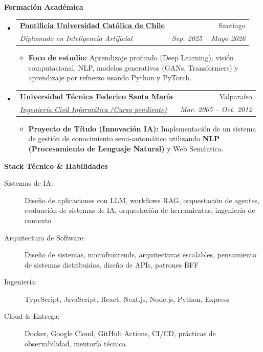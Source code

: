 \documentclass[letterpaper,11pt]{article}
\makeatletter
\newcommand{\resitem}[1]{\item #1 \vspace{-2pt}}
\newcommand{\resheading}[1]{{\large \colorbox{mygrey}{\begin{minipage}{\textwidth}{\textbf{#1 \vphantom{p\^{E}}}}\end{minipage}}}}
\newcommand{\ressubheading}[4]{
    \begin{tabular*}{6.5in}{l@{\extracolsep{\fill}}r}
            \textbf{#1} & #2 \\
            \textit{#3} & \textit{#4} \\
    \end{tabular*}\vspace{-6pt}}
\makeatother
\begin{document}
    \newpage
    \resheading{Formación Académica}
        \begin{itemize}
            \item
                \ressubheading{\href{https://educacionprofesional.ing.uc.cl/?diplomado=diplomado-en-inteligencia-artificial}{Pontificia Universidad Católica de Chile}}{Santiago}{Diplomado en Inteligencia Artificial}{Sep. 2025 -- Mayo 2026}
                    { \footnotesize
                    \begin{itemize}
                        \resitem{\textbf{Foco de estudio:} Aprendizaje profundo (Deep Learning), visión computacional, NLP, modelos generativos (GANs, Transformers) y aprendizaje por refuerzo usando Python y PyTorch.}
                    \end{itemize}
                    }
            \item
                \ressubheading{\href{http://www.usm.cl}{Universidad Técnica Federico Santa María}}{Valparaíso}{\href{http://www.inf.utfsm.cl}{Ingeniería Civil Informática (Curso pendiente)}}{Mar. 2005 -- Oct. 2012}
                    { \footnotesize
                    \begin{itemize}
                        \resitem{\textbf{Proyecto de Título (Innovación IA):} Implementación de un sistema de gestión de conocimiento semi-automático utilizando \textbf{NLP (Procesamiento de Lenguaje Natural)} y Web Semántica.}
                    \end{itemize}
                    }
        \end{itemize}

    \resheading{Stack Técnico \& Habilidades}
        \begin{description}
            \item[Sistemas de IA:] { \footnotesize Diseño de aplicaciones con LLM, workflows RAG, orquestación de agentes, evaluación de sistemas de IA, orquestación de herramientas, ingeniería de contexto}
            \item[Arquitectura de Software:] { \footnotesize Diseño de sistemas, microfrontends, arquitecturas escalables, pensamiento de sistemas distribuidos, diseño de APIs, patrones BFF}
            \item[Ingeniería:] { \footnotesize TypeScript, JavaScript, React, Next.js, Node.js, Python, Express}
            \item[Cloud \& Entrega:] { \footnotesize Docker, Google Cloud, GitHub Actions, CI/CD, prácticas de observabilidad, mentoría técnica}
        \end{description} %
\end{document}
